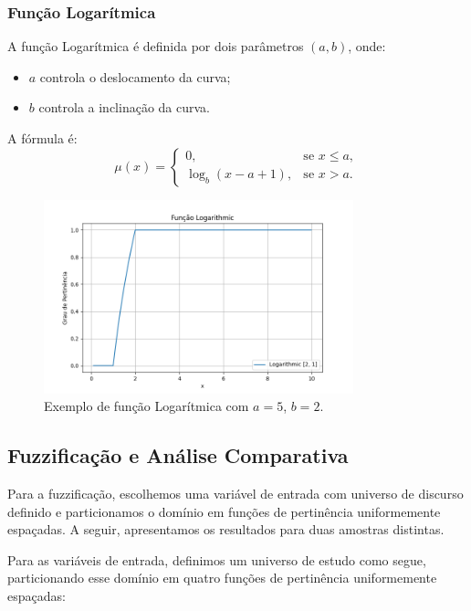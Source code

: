 \documentclass[a4paper,12pt]{article}
\begin{document}
\subsubsection{Função Logarítmica}
A função Logarítmica é definida por dois parâmetros $(a, b)$, onde:
\begin{itemize}
    \item $a$ controla o deslocamento da curva;
    \item $b$ controla a inclinação da curva.
\end{itemize}
A fórmula é:
\[
\mu(x) = 
\begin{cases}
0, & \text{se } x \leq a, \\
\log_b(x - a + 1), & \text{se } x > a.
\end{cases}
\]
\begin{figure}[H]
    \centering
    \includegraphics[width=0.8\textwidth]{img/logarithmic.png}
    \caption{Exemplo de função Logarítmica com $a=5$, $b=2$.}
\end{figure}


\subsection{Fuzzificação e Análise Comparativa}

Para a fuzzificação, escolhemos uma variável de entrada com universo de discurso definido e particionamos o domínio em funções de pertinência uniformemente espaçadas. A seguir, apresentamos os resultados para duas amostras distintas.

Para as variáveis de entrada, definimos um universo de estudo como segue, particionando esse domínio em quatro funções de pertinência uniformemente espaçadas:
\end{document}
